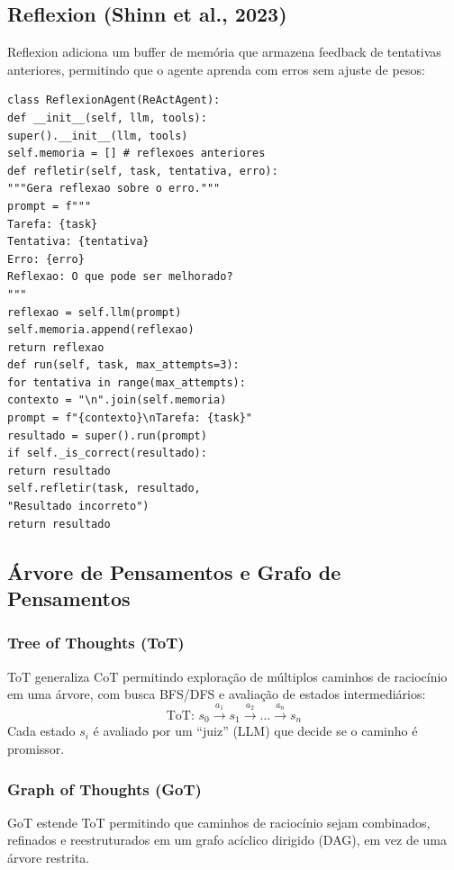 \subsection{Reflexion (Shinn et al., 2023)}
Reflexion \cite{shinn2023reflexion} adiciona um buffer de memória que
armazena feedback de tentativas anteriores, permitindo que o agente aprenda
com erros sem ajuste de pesos:
\begin{lstlisting}[style=pythonstyle]
class ReflexionAgent(ReActAgent):
def __init__(self, llm, tools):
super().__init__(llm, tools)
self.memoria = [] # reflexoes anteriores
def refletir(self, task, tentativa, erro):
"""Gera reflexao sobre o erro."""
prompt = f"""
Tarefa: {task}
Tentativa: {tentativa}
Erro: {erro}
Reflexao: O que pode ser melhorado?
"""
reflexao = self.llm(prompt)
self.memoria.append(reflexao)
return reflexao
def run(self, task, max_attempts=3):
for tentativa in range(max_attempts):
contexto = "\n".join(self.memoria)
prompt = f"{contexto}\nTarefa: {task}"
resultado = super().run(prompt)
if self._is_correct(resultado):
return resultado
self.refletir(task, resultado,
"Resultado incorreto")
return resultado
\end{lstlisting}
\subsection{Árvore de Pensamentos e Grafo de Pensamentos}
\subsubsection*{Tree of Thoughts (ToT)}
ToT \cite{yao2023tree} generaliza CoT permitindo exploração de múltiplos
caminhos de raciocínio em uma árvore, com busca BFS/DFS e avaliação de
estados intermediários:
\[\text{ToT: } s_0 \xrightarrow{a_1} s_1 \xrightarrow{a_2} \ldots \xrightarrow{a_n} s_n
\]
Cada estado $s_i$ é avaliado por um ``juiz'' (LLM) que decide se o caminho
é promissor.
\subsubsection*{Graph of Thoughts (GoT)}
GoT \cite{besta2024graph} estende ToT permitindo que caminhos de raciocínio
sejam combinados, refinados e reestruturados em um grafo acíclico dirigido
(DAG), em vez de uma árvore restrita.
